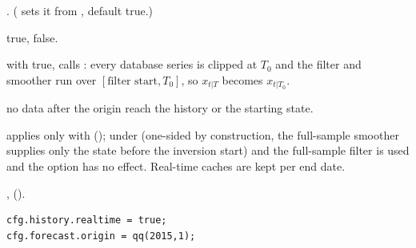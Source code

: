 \documentclass[11pt,a4paper]{article}
\DeclareRobustCommand{\codem}[1]{\texttt{\detokenize{#1}}}
\newenvironment{optspec}%
  {\begin{description}[style=sameline,leftmargin=2.7cm,labelwidth=2.5cm,font=\normalfont\itshape]}%
  {\end{description}}
\begin{document}
\subsubsection{\texorpdfstring{\codem{history.realtime}}{history.realtime}}\label{opt:history-realtime}
\begin{optspec}
  \item[Default] . ( sets it from ,
        default true.)
  \item[Values] true, false.
  \item[Math] with true,  calls :
        every database series is clipped at $T_0$ and the filter and smoother run over
        $[\text{filter start}, T_0]$, so $x_{t|T}$ becomes $x_{t|T_0}$.
  \item[Assumptions] no data after the origin reach the history or the starting state.
  \item[Interactions] applies only with  ();
        under  (one-sided by construction, the full-sample smoother supplies
        only the state before the inversion start) and  the full-sample filter is
        used and the option has no effect. Real-time caches are kept per end date.
  \item[Code] ,  ().
  \item[Example]
\begin{lstlisting}
cfg.history.realtime = true;
cfg.forecast.origin = qq(2015,1);
\end{lstlisting}
\end{optspec}
\end{document}
